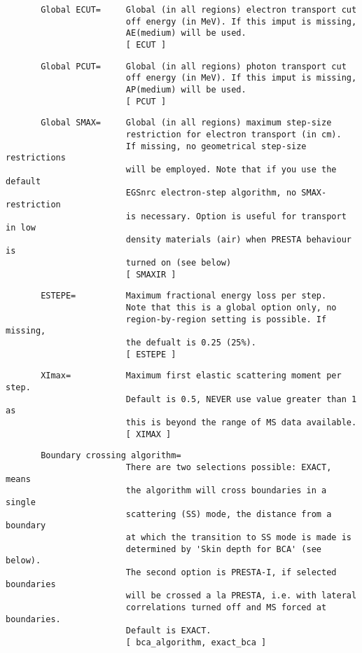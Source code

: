 
\begin{verbatim}
       Global ECUT=     Global (in all regions) electron transport cut
                        off energy (in MeV). If this imput is missing,
                        AE(medium) will be used.
                        [ ECUT ]
\end{verbatim}
\begin{verbatim}
       Global PCUT=     Global (in all regions) photon transport cut
                        off energy (in MeV). If this imput is missing,
                        AP(medium) will be used.
                        [ PCUT ]
\end{verbatim}
\begin{verbatim}
       Global SMAX=     Global (in all regions) maximum step-size
                        restriction for electron transport (in cm).
                        If missing, no geometrical step-size restrictions
                        will be employed. Note that if you use the default
                        EGSnrc electron-step algorithm, no SMAX-restriction
                        is necessary. Option is useful for transport in low
                        density materials (air) when PRESTA behaviour is
                        turned on (see below)
                        [ SMAXIR ]
\end{verbatim}
\begin{verbatim}
       ESTEPE=          Maximum fractional energy loss per step.
                        Note that this is a global option only, no
                        region-by-region setting is possible. If missing,
                        the defualt is 0.25 (25%).
                        [ ESTEPE ]
\end{verbatim}
\begin{verbatim}
       XImax=           Maximum first elastic scattering moment per step.
                        Default is 0.5, NEVER use value greater than 1 as
                        this is beyond the range of MS data available.
                        [ XIMAX ]
\end{verbatim}
\begin{verbatim}
       Boundary crossing algorithm=
                        There are two selections possible: EXACT, means
                        the algorithm will cross boundaries in a single
                        scattering (SS) mode, the distance from a boundary
                        at which the transition to SS mode is made is
                        determined by 'Skin depth for BCA' (see below).
                        The second option is PRESTA-I, if selected boundaries
                        will be crossed a la PRESTA, i.e. with lateral
                        correlations turned off and MS forced at boundaries.
                        Default is EXACT.
                        [ bca_algorithm, exact_bca ]
\end{verbatim}
